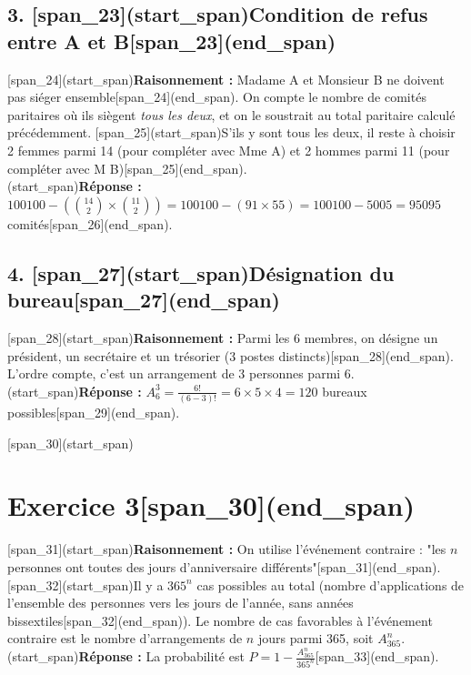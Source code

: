 \documentclass[11pt,a4paper]{article}
\begin{document}
\subsection*{3. [span_23](start_span)Condition de refus entre A et B[span_23](end_span)}
[span_24](start_span)\textbf{Raisonnement :} Madame A et Monsieur B ne doivent pas siéger ensemble[span_24](end_span). On compte le nombre de comités paritaires où ils siègent \textit{tous les deux}, et on le soustrait au total paritaire calculé précédemment.
[span_25](start_span)S'ils y sont tous les deux, il reste à choisir 2 femmes parmi 14 (pour compléter avec Mme A) et 2 hommes parmi 11 (pour compléter avec M B)[span_25](end_span).\\
[span_26](start_span)\textbf{Réponse :} $100100 - \left( \binom{14}{2} \times \binom{11}{2} \right) = 100100 - (91 \times 55) = 100100 - 5005 = 95095$ comités[span_26](end_span).

\subsection*{4. [span_27](start_span)Désignation du bureau[span_27](end_span)}
[span_28](start_span)\textbf{Raisonnement :} Parmi les 6 membres, on désigne un président, un secrétaire et un trésorier (3 postes distincts)[span_28](end_span). L'ordre compte, c'est un arrangement de 3 personnes parmi 6.\\
[span_29](start_span)\textbf{Réponse :} $A_6^3 = \frac{6!}{(6-3)!} = 6 \times 5 \times 4 = 120$ bureaux possibles[span_29](end_span).

\hrulefill

[span_30](start_span)\section*{Exercice 3[span_30](end_span)}
[span_31](start_span)\textbf{Raisonnement :} On utilise l'événement contraire : "les $n$ personnes ont toutes des jours d'anniversaire différents"[span_31](end_span). [span_32](start_span)Il y a $365^n$ cas possibles au total (nombre d'applications de l'ensemble des personnes vers les jours de l'année, sans années bissextiles[span_32](end_span)). Le nombre de cas favorables à l'événement contraire est le nombre d'arrangements de $n$ jours parmi 365, soit $A_{365}^n$.\\
[span_33](start_span)\textbf{Réponse :} La probabilité est $P = 1 - \frac{A_{365}^n}{365^n}$[span_33](end_span).

\hrulefill
\end{document}

